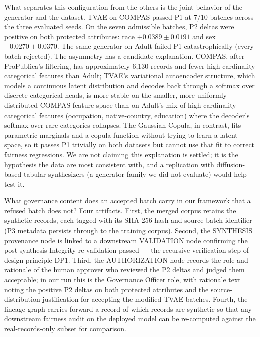 \documentclass[11pt]{article}
\begin{document}
What separates this configuration from the others is the joint behavior of the generator and the dataset. TVAE on COMPAS passed P1 at $7/10$ batches across the three evaluated seeds. On the seven admissible batches, P2 deltas were positive on both protected attributes: race $+0.0389 \pm 0.0191$ and sex $+0.0270 \pm 0.0370$. The same generator on Adult failed P1 catastrophically (every batch rejected). The asymmetry has a candidate explanation. COMPAS, after ProPublica's filtering, has approximately 6{,}130 records and fewer high-cardinality categorical features than Adult; TVAE's variational autoencoder structure, which models a continuous latent distribution and decodes back through a softmax over discrete categorical heads, is more stable on the smaller, more uniformly distributed COMPAS feature space than on Adult's mix of high-cardinality categorical features (occupation, native-country, education) where the decoder's softmax over rare categories collapses. The Gaussian Copula, in contrast, fits parametric marginals and a copula function without trying to learn a latent space, so it passes P1 trivially on both datasets but cannot use that fit to correct fairness regressions. We are not claiming this explanation is settled; it is the hypothesis the data are most consistent with, and a replication with diffusion-based tabular synthesizers (a generator family we did not evaluate) would help test it.

What governance content does an accepted batch carry in our framework that a refused batch does not? Four artifacts. First, the merged corpus retains the synthetic records, each tagged with its SHA-256 hash and source-batch identifier (P3 metadata persists through to the training corpus). Second, the SYNTHESIS provenance node is linked to a downstream VALIDATION node confirming the post-synthesis Integrity re-validation passed --- the recursive verification step of design principle DP1. Third, the AUTHORIZATION node records the role and rationale of the human approver who reviewed the P2 deltas and judged them acceptable; in our run this is the Governance Officer role, with rationale text noting the positive P2 deltas on both protected attributes and the source-distribution justification for accepting the modified TVAE batches. Fourth, the lineage graph carries forward a record of which records are synthetic so that any downstream fairness audit on the deployed model can be re-computed against the real-records-only subset for comparison.
\end{document}
